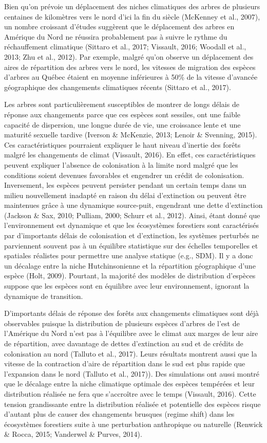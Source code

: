 \documentclass[
]{article}
\begin{document}
Bien qu'on prévoie un déplacement des niches climatiques des arbres de
plusieurs centaines de kilomètres vers le nord d'ici la fin du siècle
(McKenney et al., 2007), un nombre croissant d'études suggèrent que le
déplacement des arbres en Amérique du Nord ne réussira probablement pas
à suivre le rythme du réchauffement climatique (Sittaro et al., 2017;
Vissault, 2016; Woodall et al., 2013; Zhu et al., 2012). Par exemple,
malgré qu'on observe un déplacement des aires de répartition des arbres
vers le nord, les vitesses de migration des espèces d'arbres au Québec
étaient en moyenne inférieures à 50\% de la vitesse d'avancée
géographique des changements climatiques récents (Sittaro et al., 2017).

Les arbres sont particulièrement susceptibles de montrer de longs délais
de réponse aux changements parce que ces espèces sont sessiles, ont une
faible capacité de dispersion, une longue durée de vie, une croissance
lente et une maturité sexuelle tardive (Iverson \& McKenzie, 2013;
Lenoir \& Svenning, 2015). Ces caractéristiques pourraient expliquer le
haut niveau d'inertie des forêts malgré les changements de climat
(Vissault, 2016). En effet, ces caractéristiques peuvent expliquer
l'absence de colonisation à la limite nord malgré que les conditions
soient devenues favorables et engendrer un crédit de colonisation.
Inversement, les espèces peuvent persister pendant un certain temps dans
un milieu nouvellement inadapté en raison du délai d'extinction ou
peuvent être maintenues grâce à une dynamique source-puit, engendrant
une dette d'extinction (Jackson \& Sax, 2010; Pulliam, 2000; Schurr et
al., 2012). Ainsi, étant donné que l'environnement est dynamique et que
les écosystèmes forestiers sont caractérisés par d'importants délais de
colonisation et d'extinction, les systèmes perturbés ne parviennent
souvent pas à un équilibre statistique sur des échelles temporelles et
spatiales réalistes pour permettre une analyse statique (e.g., SDM). Il
y a donc un décalage entre la niche Hutchinsonienne et la répartition
géographique d'une espèce (Holt, 2009). Pourtant, la majorité des
modèles de distribution d'espèces suppose que les espèces sont en
équilibre avec leur environnement, ignorant la dynamique de transition.

D'importants délais de réponse des forêts aux changements climatiques
sont déjà observables puisque la distribution de plusieurs espèces
d'arbres de l'est de l'Amérique du Nord n'est pas à l'équilibre avec le
climat aux marges de leur aire de répartition, avec davantage de dettes
d'extinction au sud et de crédits de colonisation au nord (Talluto et
al., 2017). Leurs résultats montrent aussi que la vitesse de la
contraction d'aire de répartition dans le sud est plus rapide que
l'expansion dans le nord (Talluto et al., 2017)). Des simulations ont
aussi montré que le décalage entre la niche climatique optimale des
espèces tempérées et leur distribution réalisée ne fera que s'accroître
avec le temps (Vissault, 2016). Cette tension grandissante entre la
distribution réalisée et potentielle des espèces risque d'autant plus de
causer des changements brusques (regime shift) dans les écosystèmes
forestiers suite à une perturbation anthropique ou naturelle (Renwick \&
Rocca, 2015; Vanderwel \& Purves, 2014).
\end{document}
